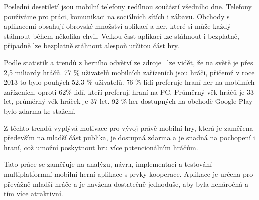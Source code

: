 \begin{introduction}
Poslední desetiletí jsou mobilní telefony nedílnou součástí všedního dne.
Telefony používáme pro práci, komunikaci na sociálních sítích i zábavu.
Obchody s aplikacemi obsahují obrovské množství aplikací a her,
které si může každý stáhnout během několika chvil.
Velkou část aplikací lze stáhnout i bezplatně,
případně lze bezplatně stáhnout alespoň určitou část hry.

Podle statistik a trendů z herního odvětví
ze zdroje~\cite{wepc_video_game_statistics} lze vidět,
že na světě je přes 2,5 miliardy hráčů.
77 \% uživatelů mobilních zařízeních jsou hráči,
přičemž v roce 2013 to bylo pouhých 52,3 \% uživatelů.
76 \% lidí preferuje hraní her na mobilních zařízeních,
oproti 62\% lidí, kteří preferují hraní na PC.
Průměrný věk hráčů je 33 let, průměrný věk hráček je 37 let.
92 \% her dostupných na obchodě Google Play bylo
zdarma ke stažení.~\cite{wepc_video_game_statistics}

Z těchto trendů vyplývá motivace pro vývoj právě mobilní hry,
která je zaměřena především na mladší část publika,
je dostupná zdarma a je snadná na pochopení i hraní,
což umožní poskytnout hru více potencionálním hráčům.

Tato práce se zaměřuje na analýzu, návrh, implementaci a testování
multiplatformní mobilní herní aplikace s prvky kooperace.
Aplikace je určena pro převážně mladší hráče
a je navžena dostatečně jednoduše,
aby byla nenáročná a tím více atraktivní.

\end{introduction}
